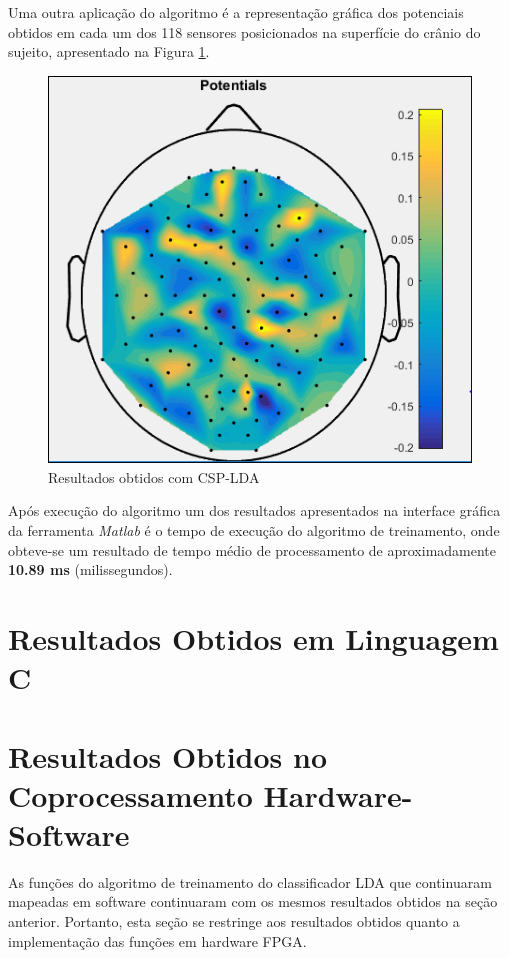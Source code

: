 Uma outra aplicação do algoritmo é a representação gráfica dos potenciais obtidos em cada um dos 118 sensores posicionados na superfície do crânio do sujeito, apresentado na Figura \ref{resultadoLotte}.
\newpage
\begin{figure}[h]
	\centering
	\includegraphics[keepaspectratio=true,scale=0.45]{figuras/image_csp_matlab.PNG}
	\caption{Resultados obtidos  com CSP-LDA}
	\label{resultadoLotte}
\end{figure}

Após execução do algoritmo um dos resultados apresentados na interface gráfica da ferramenta \textit{Matlab} é o tempo de execução do algoritmo de treinamento, onde obteve-se um resultado de tempo médio de processamento de aproximadamente \textbf{10.89 ms} (milissegundos).

\section{Resultados Obtidos em Linguagem C}


\section{Resultados Obtidos no Coprocessamento Hardware-Software}
As funções do algoritmo de treinamento do classificador LDA que continuaram mapeadas em software continuaram com os mesmos resultados obtidos na seção anterior. Portanto, esta seção se restringe aos resultados obtidos quanto a implementação das funções em hardware FPGA.

